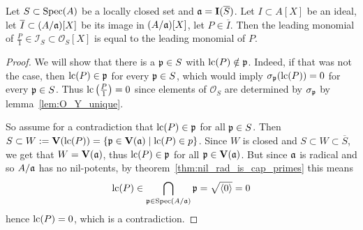 \begin{lemma}\label{lem:embed_preserves_LM}
  Let $S \subset \operatorname{Spec}(A)$ be a locally closed set and $\mathfrak{a} = \operatorname{\mathbf I}(\overline S)$. Let $I \subset A[X]$ be an ideal, let $\overline I \subset (A/\mathfrak{a})[X]$ be its image in $(A/\mathfrak{a})[X]$, let $P \in \overline I$. Then the leading monomial of $\frac P 1 \in \mathcal I_{S} \subset \mathcal O_{S}[X]$ is equal to the leading monomial of $P$.
\end{lemma}
\begin{proof}
  We will show that there is a $\mathfrak p \in S$ with $\operatorname{lc}(P) \notin \mathfrak p$. Indeed, if that was not the case, then $\operatorname{lc}(P) \in \mathfrak p$ for every $\mathfrak p \in S$, which would imply $\sigma_{\mathfrak p}(\operatorname{lc}(P)) = 0$ for every $\mathfrak p \in S$. Thus $\operatorname{lc}\left(\frac P 1\right) = 0$ since elements of $\mathcal O_{S}$ are determined by $\sigma_{\mathfrak p}$ by lemma~\ref{lem:O_Y_unique}.

  So assume for a contradiction that $\operatorname{lc}(P) \in \mathfrak p$ for all $\mathfrak p \in S$. Then $S \subset W := \operatorname{\mathbf V}(\operatorname{lc}(P)) = \{\mathfrak p \in \operatorname{\mathbf V}(\mathfrak{a}) \mid \operatorname{lc}(P) \in p\}$. Since $W$ is closed and $S \subset W \subset \overline S$, we get that $W = \operatorname{\mathbf V}(\mathfrak{a})$, thus $\operatorname{lc}(P) \in \mathfrak p $ for all $\mathfrak p \in \operatorname{\mathbf V}(\mathfrak{a})$. But since $\mathfrak{a}$ is radical and so $A/\mathfrak{a}$ has no nil-potents, by theorem~\ref{thm:nil_rad_is_cap_primes} this means
  \[\operatorname{lc}(P) \in \bigcap_{\mathfrak p \in \operatorname{Spec}(A/\mathfrak{a})} \mathfrak p = \sqrt{\langle 0 \rangle} = 0\]
  hence $\operatorname{lc}(P) = 0$, which is a contradiction.
\end{proof}



